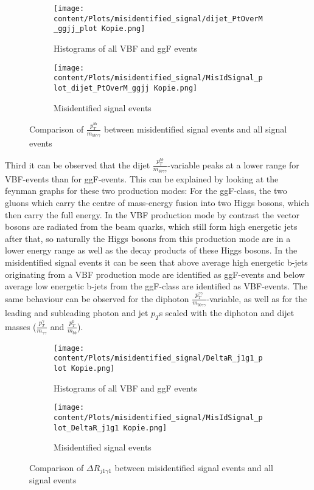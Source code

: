 \begin{figure}[H]
    \centering
    \begin{subfigure}{0.45\textwidth}
        \centering
        \texttt{[image: content/Plots/misidentified\_signal/dijet\_PtOverM\_ggjj\_plot Kopie.png]}
        \caption{Histograms of all VBF and ggF events}
        \label{fig:roc1}
    \end{subfigure}
    \hfill
    \begin{subfigure}{0.45\textwidth}
        \centering
        \texttt{[image: content/Plots/misidentified\_signal/MisIdSignal\_plot\_dijet\_PtOverM\_ggjj Kopie.png]}
        \caption{Misidentified signal events}
        \label{fig:roc2}
    \end{subfigure}
    \caption{Comparison of $\frac{p_T^{bb}}{m_{bb \gamma \gamma}}$ between misidentified signal events and all signal events}
    \label{fig:combined_roc}
\end{figure}

Third it can be observed that the dijet $\frac{p_T^{bb}}{m_{bb \gamma \gamma}}$-variable peaks at a lower range for VBF-events than for ggF-events. This can be explained by looking at the 
feynman graphs for these two production modes: For the ggF-class, the two gluons which carry the centre of mass-energy fusion into two Higgs bosons, which then carry the full energy. In the VBF
production mode by contrast the vector bosons are radiated from the beam quarks, which still form high energetic jets after that, so naturally the Higgs bosons from this production mode
are in a lower energy range as well as the decay products of these Higgs bosons. In the misidentified signal events it can be seen that above average high energetic b-jets originating from a VBF production mode
are identified as ggF-events and below average low energetic b-jets from the ggF-class are identified as VBF-events. The same behaviour can be observed for the diphoton $\frac{p_T^{\gamma \gamma}}{m_{bb \gamma \gamma}}$-variable,
as well as for the leading and subleading photon and jet $p_T$s scaled with the diphoton and dijet masses ($\frac{p_T^{\gamma}}{m_{\gamma \gamma}}$ and $\frac{p_T^{b}}{m_{bb}}$).

\begin{figure}[H]
    \centering
    \begin{subfigure}{0.45\textwidth}
        \centering
        \texttt{[image: content/Plots/misidentified\_signal/DeltaR\_j1g1\_plot Kopie.png]}
        \caption{Histograms of all VBF and ggF events}
        \label{fig:roc1}
    \end{subfigure}
    \hfill
    \begin{subfigure}{0.45\textwidth}
        \centering
        \texttt{[image: content/Plots/misidentified\_signal/MisIdSignal\_plot\_DeltaR\_j1g1 Kopie.png]}
        \caption{Misidentified signal events}
        \label{fig:roc2}
    \end{subfigure}
    \caption{Comparison of $\Delta R_{j1 \gamma 1}$ between misidentified signal events and all signal events}
    \label{fig:combined_roc}
\end{figure}

